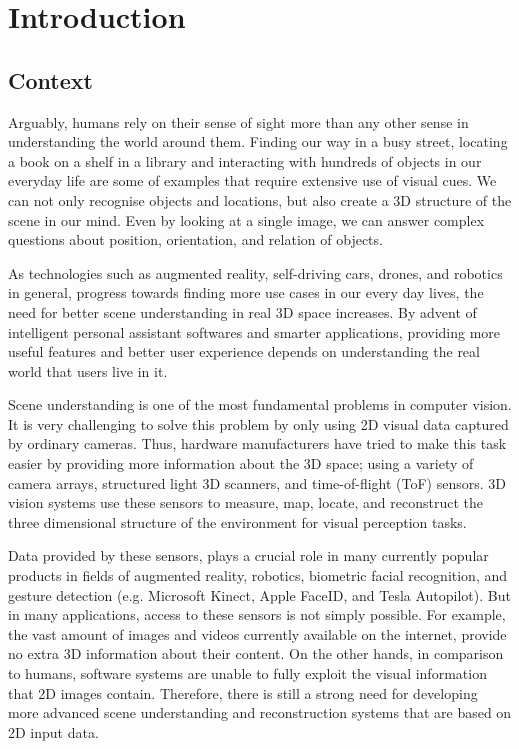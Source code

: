 \chapter{Introduction}
\label{Introduction}

\section{Context}

Arguably, humans rely on their sense of sight more than any other sense in understanding the world around them. Finding our way in a busy street, locating a book on a shelf in a library and interacting with hundreds of objects in our everyday life are some of examples that require extensive use of visual cues. We can not only recognise objects and locations, but also create a 3D structure of the scene in our mind. Even by looking at a single image, we can answer complex questions about position, orientation, and relation of objects. 

As technologies such as augmented reality, self-driving cars, drones, and robotics in general, progress towards finding more use cases in our every day lives, the need for better scene understanding in real 3D space increases. By advent of intelligent personal assistant softwares and smarter applications, providing more useful features and better user experience depends on understanding the real world that users live in it.

Scene understanding is one of the most fundamental problems in computer vision. It is very challenging to solve this problem by only using 2D visual data captured by ordinary cameras. Thus, hardware manufacturers have tried to make this task easier by providing more information about the 3D space; using a variety of camera arrays, structured light 3D scanners, and time-of-flight (ToF) sensors. 3D vision systems use these sensors to measure, map, locate, and reconstruct the three dimensional structure of the environment for visual perception tasks.  

Data provided by these sensors, plays a crucial role in many currently popular products in fields of augmented reality, robotics, biometric facial recognition, and gesture detection (e.g. Microsoft Kinect, Apple FaceID, and Tesla Autopilot). But in many applications, access to these sensors is not simply possible. For example, the vast amount of images and videos currently available on the internet, provide no extra 3D information about their content. On the other hands, in comparison to humans, software systems are unable to fully exploit the visual information that 2D images contain. Therefore, there is still a strong need for developing more advanced scene understanding and reconstruction systems that are based on 2D input data.      

